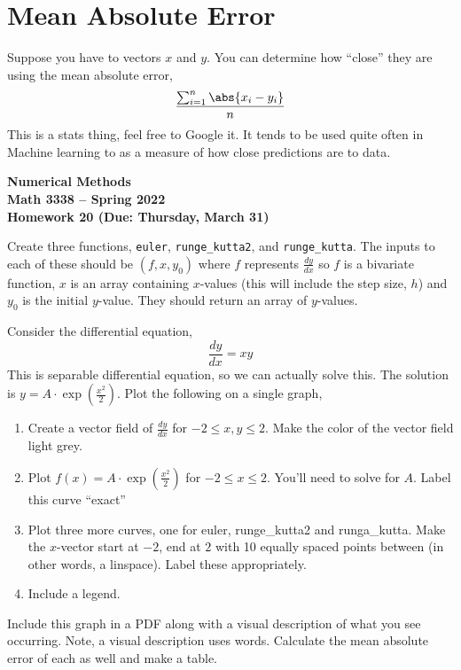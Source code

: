 \documentclass[11pt,letterpaper]{article}
\newcommand{\semester}{Spring 2022}
\newcommand{\due}{Thursday, March 31}
\begin{document}
\section{Mean Absolute Error}
Suppose you have to vectors $x$ and $y$. You can determine how ``close'' they are using the mean
absolute error,
\[
 \dfrac{ \sum_{i=1}^n \abs{x_i-y_i}}{n}
\]
This is a stats thing, feel free to Google it. It tends to be used quite often in Machine learning 
to as a measure of how close predictions are to data.







\newpage

\begin{center}
{\huge{\bf  Numerical Methods}} \\[1.5ex]
{\bf Math 3338 -- \semester}\\[1.5ex]
{\Large{\bf Homework 20 (Due: \due)}}\\
\end{center}
\vspace{2mm}


\begin{problem}
 Create three functions, \texttt{euler}, \texttt{runge\_kutta2}, and \texttt{runge\_kutta}. The
inputs to each of these should be $(f,x,y_0)$ where $f$ represents $\frac{dy}{dx}$ so
$f$ is a bivariate function, $x$ is an
array containing $x$-values (this will include the step size, $h$) and $y_0$ is the initial
$y$-value. They should return an array of $y$-values.
\end{problem}




\begin{problem}
 Consider the differential equation,
\[
 \frac{dy}{dx} = xy
\]
This is separable differential equation, so we can actually solve this. The solution is 
$y=A\cdot\exp\left(\frac{x^2}{2}\right)$. Plot the following on a single graph,

\begin{enumerate}
 \item Create a vector field of $\frac{dy}{dx}$ for $-2\le x,y\le 2$. Make the color of the vector field light grey.
 \item Plot $f(x) = A\cdot\exp\left(\frac{x^2}{2}\right)$ for $-2\le x\le 2$. You'll need to solve
for $A$. Label this curve ``exact''
 \item Plot three more curves, one for euler, runge\_kutta2 and runga\_kutta. Make the $x$-vector
start at $-2$, end at $2$ with 10 equally spaced points between (in other words, a linspace). Label 
these appropriately.
 \item Include a legend.
\end{enumerate}

Include this graph in a PDF along with a visual description of what you see occurring. Note, a visual
description uses words. Calculate the mean absolute error of each as well and make a table.

\end{problem}
\end{document}
